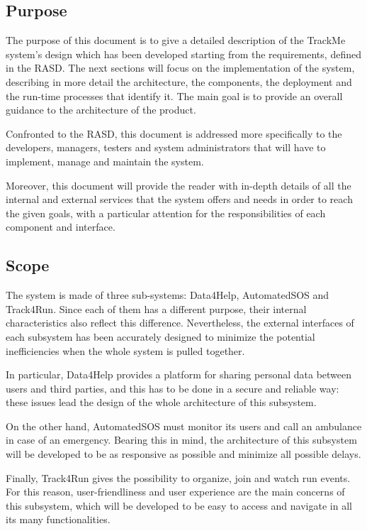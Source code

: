 \subsection{Purpose}
The purpose of this document is to give a detailed description of the TrackMe system's design which has been developed starting from the requirements, defined in the RASD. The next sections will focus on the implementation of the system, describing in more detail the architecture, the components, the deployment  and the run-time processes that identify it.
The main goal is to provide an overall guidance to the architecture of the product.

Confronted to the RASD, this document is addressed more specifically to the developers, managers, testers and system administrators that will have to implement, manage and maintain the system.

Moreover, this document will provide the reader with in-depth details of all the internal and external services that the system offers and needs in order to reach the given goals, with a particular attention for the responsibilities of each component and interface.
 
\subsection{Scope}

The system is made of three sub-systems: Data4Help, AutomatedSOS and Track4Run. 
Since each of them has a different purpose, their internal characteristics also reflect this difference. Nevertheless, the external interfaces of each subsystem has been accurately designed to minimize the potential inefficiencies when the whole system is pulled together.

In particular, Data4Help provides a platform for sharing personal data between users and third parties, and this has to be done in a secure and reliable way: these issues lead the design of the whole architecture of this subsystem.

On the other hand, AutomatedSOS must monitor its users and call an ambulance in case of an emergency. Bearing this in mind, the architecture of this subsystem will be developed to be as responsive as possible and minimize all possible delays.

Finally, Track4Run gives the possibility to organize, join and watch run events. For this reason, user-friendliness and user experience are the main concerns of this subsystem, which will be developed to be easy to access and navigate in all its many functionalities.

